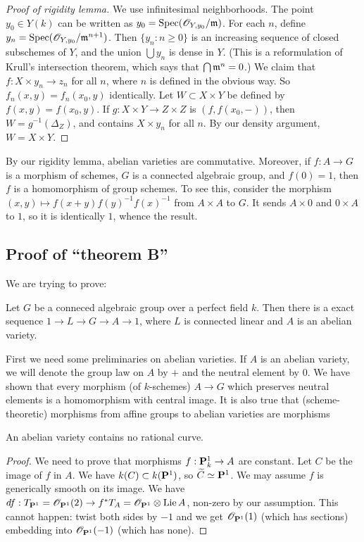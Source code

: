 \begin{proof}[Proof of rigidity lemma]
We use infinitesimal neighborhoods. The point $y_0\in Y(k)$ can be written 
as $y_0=\operatorname{Spec}(\mathscr{O}_{Y,y_0}/\mathfrak{m})$. For each $n$, define 
$y_n = \operatorname{Spec}(\mathscr{O}_{Y,y_0}/\mathfrak{m}^{n+1})$. Then $\{y_n:n\geqslant 0\}$ is 
an increasing sequence of closed subschemes of $Y$, and the union 
$\bigcup y_n$ is dense in $Y$. (This is a reformulation of Krull's 
intersection theorem, which says that $\bigcap \mathfrak{m}^n=0$.) We claim that 
$f:X\times y_n \to z_n$ for all $n$, where $n$ is defined in the obvious 
way.  So $f_n(x,y) = f_n(x_0,y)$ identically. Let 
$W\subset X\times Y$ be defined by $f(x,y) = f(x_0,y)$. If 
$g:X\times Y\to Z\times Z$ is $(f,f(x_0,-))$, then 
$W=g^{-1}(\Delta_Z)$, and contains $X\times y_n$ for all 
$n$. By our density argument, $W=X\times Y$. 
\end{proof}

By our rigidity lemma, abelian varieties are commutative. Moreover, if 
$f:A\to G$ is a morphism of schemes, $G$ is a connected algebraic group, 
and $f(0)=1$, then $f$ is a homomorphism of group schemes. To see this, 
consider the morphism $(x,y)\mapsto f(x+y) f(y)^{-1} f(x)^{-1}$ from 
$A\times A$ to $G$. It sends $A\times 0$ and $0\times A$ to $1$, so it is 
identically $1$, whence the result. 





\subsection{Proof of ``theorem B''}

We are trying to prove: 

\begin{theo}
Let $G$ be a conneced algebraic group over a perfect field $k$. Then there is a 
exact sequence $1 \to L \to G \to A \to 1$, where $L$ is connected linear and 
$A$ is an abelian variety. 
\end{theo}

First we need some preliminaries on abelian varieties. If $A$ is an abelian 
variety, we will denote the group law on $A$ by $+$ and the neutral element 
by $0$. We have shown that every morphism (of $k$-schemes) $A\to G$ which 
preserves neutral elements is a homomorphism with central image. It is also 
true that (scheme-theoretic) morphisms from affine groups to abelian varieties 
are morphisms 

\begin{prop}
An abelian variety contains no rational curve. 
\end{prop}
\begin{proof}
We need to prove that morphisms $f:\mathbf{P}_k^1 \to A$ are constant. Let $C$ be 
the image of $f$ in $A$. We have $k(C)\subset k(\mathbf{P}^1)$, so 
$\widetilde C\simeq \mathbf{P}^1$. We may assume $f$ is generically smooth on its 
image. We have 
$d f:T_{\mathbf{P}^1} = \mathscr{O}_{\mathbf{P}^1}(2) \to f^\ast T_A = \mathscr{O}_{\mathbf{P}^1}\otimes \operatorname{Lie} A$, 
non-zero by our assumption. This cannot happen: twist both sides by $-1$ and 
we get $\mathscr{O}_{\mathbf{P}^1}(1)$ (which has sections) embedding into 
$\mathscr{O}_{\mathbf{P}^1}(-1)$ (which has none). 
\end{proof}

